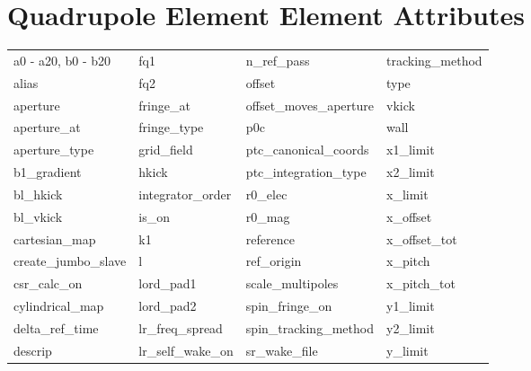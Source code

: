  \section{Quadrupole Element Element Attributes}
 \label{s:list.quadrupole}
 
 \begin{tabular}{llll} \toprule
a0 - a20, b0 - b20          & fq1                         & n_ref_pass                  & tracking_method             \\
alias                       & fq2                         & offset                      & type                        \\
aperture                    & fringe_at                   & offset_moves_aperture       & vkick                       \\
aperture_at                 & fringe_type                 & p0c                         & wall                        \\
aperture_type               & grid_field                  & ptc_canonical_coords        & x1_limit                    \\
b1_gradient                 & hkick                       & ptc_integration_type        & x2_limit                    \\
bl_hkick                    & integrator_order            & r0_elec                     & x_limit                     \\
bl_vkick                    & is_on                       & r0_mag                      & x_offset                    \\
cartesian_map               & k1                          & reference                   & x_offset_tot                \\
create_jumbo_slave          & l                           & ref_origin                  & x_pitch                     \\
csr_calc_on                 & lord_pad1                   & scale_multipoles            & x_pitch_tot                 \\
cylindrical_map             & lord_pad2                   & spin_fringe_on              & y1_limit                    \\
delta_ref_time              & lr_freq_spread              & spin_tracking_method        & y2_limit                    \\
descrip                     & lr_self_wake_on             & sr_wake_file                & y_limit                     \\

\end{tabular}
